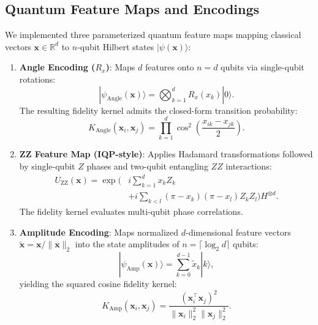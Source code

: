 \documentclass[journal,twocolumn]{IEEEtran}
\begin{document}
\subsection{Quantum Feature Maps and Encodings}
We implemented three parameterized quantum feature maps mapping classical vectors $\mathbf{x} \in \mathbb{R}^d$ to $n$-qubit Hilbert states $|\psi(\mathbf{x})\rangle$:
\begin{enumerate}
    \item \textbf{Angle Encoding ($R_x$)}: Maps $d$ features onto $n=d$ qubits via single-qubit rotations:
    \begin{equation}
    |\psi_{\text{Angle}}(\mathbf{x})\rangle = \bigotimes_{k=1}^d R_x(x_k) |0\rangle.
    \end{equation}
    The resulting fidelity kernel admits the closed-form transition probability:
    \begin{equation}
    K_{\text{Angle}}(\mathbf{x}_i, \mathbf{x}_j) = \prod_{k=1}^d \cos^2\left(\frac{x_{ik} - x_{jk}}{2}\right).
    \end{equation}
    \item \textbf{ZZ Feature Map (IQP-style)}: Applies Hadamard transformations followed by single-qubit $Z$ phases and two-qubit entangling $ZZ$ interactions:
    \begin{align}
    U_{\text{ZZ}}(\mathbf{x}) = \exp\bigg( &i \sum_{k=1}^d x_k Z_k \nonumber \\
    &+ i \sum_{k < l} (\pi - x_k)(\pi - x_l) Z_k Z_l \bigg) H^{\otimes d}.
    \end{align}
    The fidelity kernel evaluates multi-qubit phase correlations.
    \item \textbf{Amplitude Encoding}: Maps normalized $d$-dimensional feature vectors $\tilde{\mathbf{x}} = \mathbf{x}/\|\mathbf{x}\|_2$ into the state amplitudes of $n = \lceil \log_2 d \rceil$ qubits:
    \begin{equation}
    |\psi_{\text{Amp}}(\mathbf{x})\rangle = \sum_{k=0}^{d-1} \tilde{x}_k |k\rangle,
    \end{equation}
    yielding the squared cosine fidelity kernel:
    \begin{equation}
    K_{\text{Amp}}(\mathbf{x}_i, \mathbf{x}_j) = \frac{(\mathbf{x}_i^\top \mathbf{x}_j)^2}{\|\mathbf{x}_i\|_2^2 \|\mathbf{x}_j\|_2^2}.
    \end{equation}
\end{enumerate}
\end{document}
